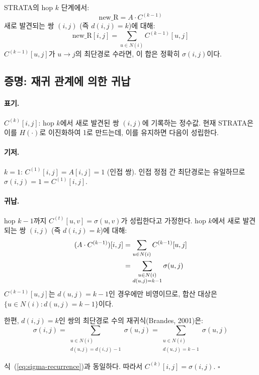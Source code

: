 \documentclass[11pt,a4paper]{article}
\begin{document}
\begin{mathbox}[핵심 관찰]
STRATA의 hop $k$ 단계에서:
\[
\text{new\_R} = A \cdot C^{(k-1)}
\]
새로 발견되는 쌍 $(i,j)$ (즉 $d(i,j) = k$)에 대해:
\[
\text{new\_R}[i,j] = \sum_{u \in N(i)} C^{(k-1)}[u,j]
\]
$C^{(k-1)}[u,j]$가 $u \to j$의 최단경로 수라면, 이 합은 정확히 $\sigma(i,j)$이다.
\end{mathbox}

\subsection{증명: 재귀 관계에 의한 귀납}

\paragraph{표기.} $C^{(k)}[i,j]$: hop $k$에서 새로 발견된 쌍 $(i,j)$에 기록하는 정수값. 현재 STRATA은 이를 $H(\cdot)$로 이진화하여 1로 만드는데, 이를 유지하면 다음이 성립한다.

\paragraph{기저.} $k=1$: $C^{(1)}[i,j] = A[i,j] = 1$ (인접 쌍). 인접 정점 간 최단경로는 유일하므로 $\sigma(i,j) = 1 = C^{(1)}[i,j]$. \checkmark

\paragraph{귀납.} hop $k-1$까지 $C^{(t)}[u,v] = \sigma(u,v)$가 성립한다고 가정한다. hop $k$에서 새로 발견되는 쌍 $(i,j)$ (즉 $d(i,j) = k$)에 대해:
\begin{align}
(A \cdot C^{(k-1)})[i,j]
  &= \sum_{u \in N(i)} C^{(k-1)}[u,j] \notag \\
  &= \sum_{\substack{u \in N(i) \\ d(u,j) = k-1}} \sigma(u,j) \label{eq:sigma-recurrence}
\end{align}
$C^{(k-1)}[u,j]$는 $d(u,j) = k-1$인 경우에만 비영이므로, 합산 대상은 $\{u \in N(i) : d(u,j) = k-1\}$이다.

한편, $d(i,j) = k$인 쌍의 최단경로 수의 재귀식(Brandes, 2001)은:
\[
\sigma(i,j) = \sum_{\substack{u \in N(i) \\ d(u,j) = d(i,j)-1}} \sigma(u,j)
  = \sum_{\substack{u \in N(i) \\ d(u,j) = k-1}} \sigma(u,j)
\]

식~(\ref{eq:sigma-recurrence})과 동일하다. 따라서 $C^{(k)}[i,j] = \sigma(i,j)$. $\square$
\end{document}
